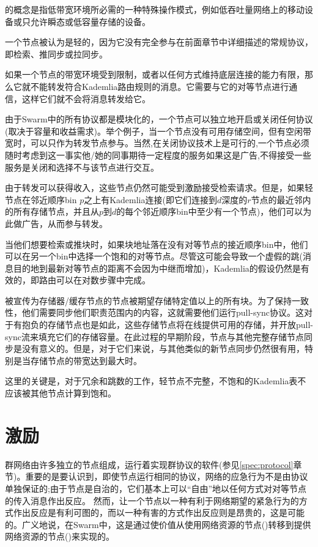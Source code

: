 的概念是指低带宽环境所必需的一种特殊操作模式，例如低吞吐量网络上的移动设备或只允许瞬态或低容量存储的设备。

一个节点被认为是轻的，因为它没有完全参与在前面章节中详细描述的常规协议，即检索、推同步或拉同步。

如果一个节点的带宽环境受到限制，或者以任何方式维持底层连接的能力有限，那么它就不能转发符合Kademlia路由规则的消息。它需要与它的对等节点进行通信，这样它们就不会将消息转发给它。

由于Swarm中的所有协议都是模块化的，一个节点可以独立地开启或关闭任何协议(取决于容量和收益需求)。举个例子，当一个节点没有可用存储空间，但有空闲带宽时，可以只作为转发节点参与。当然,在关闭协议技术上是可行的,一个节点必须随时考虑到这一事实他/她的同事期待一定程度的服务如果这是广告,不得接受一些服务是关闭和选择不与该节点进行交互。

由于转发可以获得收入，这些节点仍然可能受到激励接受检索请求。但是，如果轻节点在邻近顺序bin $p$之上有Kademlia连接(即它们连接到$d$深度的$r$节点的最近邻内的所有存储节点，并且从$p$到$d$的每个邻近顺序bin中至少有一个节点)，他们可以为此做广告，从而参与转发。

当他们想要检索或推块时，如果块地址落在没有对等节点的接近顺序bin中，他们可以在另一个bin中选择一个饱和的对等节点。尽管这可能会导致一个虚假的跳(消息目的地到最新对等节点的距离不会因为中继而增加)，Kademlia的假设仍然是有效的，即路由可以在对数步骤中完成。

被宣传为存储器/缓存节点的节点被期望存储特定值以上的所有块。为了保持一致性，他们需要同步他们职责范围内的内容，这就需要他们运行pull-sync协议。这对于有抱负的存储节点也是如此，这些存储节点将在线提供可用的存储，并开放pull-sync流来填充它们的存储容量。在此过程的早期阶段，节点与其他完整存储节点同步是没有意义的。但是，对于它们来说，与其他类似的新节点同步仍然很有用，特别是当存储节点的带宽达到最大时。

这里的关键是，对于冗余和跳数的工作，轻节点不完整，不饱和的Kademlia表不应该被其他节点计算到饱和。


\chapter{激励}\label{sec:incentivisation}
群网络由许多独立的节点组成，运行着实现群协议的软件(参见\ref{spec:protocol}章节)。重要的是要认识到，即使节点运行相同的协议，网络的应急行为不是由协议单独保证的;由于节点是自治的，它们基本上可以“自由”地以任何方式对对等节点的传入消息作出反应。
然而，让一个节点以一种有利于网络期望的紧急行为的方式作出反应是有利可图的，而以一种有害的方式作出反应则是昂贵的，这是可能的。广义地说，在Swarm中，这是通过使价值从使用网络资源的节点()转移到提供网络资源的节点()来实现的。 


